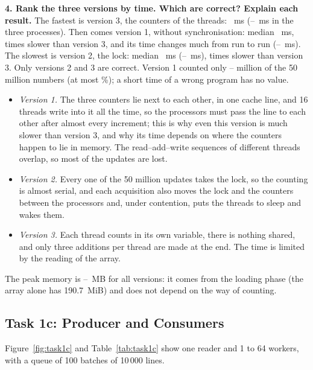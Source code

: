 \documentclass[12pt,a4paper]{article}
\begin{document}
\textbf{4. Rank the three versions by time. Which are correct? Explain each result.} The fastest is version 3, the counters of the threads: \bPerThreadMs{}~ms (\bPerThreadMsMin--\bPerThreadMsMax{}~ms in the three processes). Then comes version 1, without synchronisation: median \bNoSyncMs{}~ms, \bNoSyncRatio{} times slower than version 3, and its time changes much from run to run (\bNoSyncMsMin--\bNoSyncMsMax{}~ms). The slowest is version 2, the lock: median \bLockMs{}~ms (\bLockMsMin--\bLockMsMax{}~ms), \bLockRatio{} times slower than version 3. Only versions 2 and 3 are correct. Version 1 counted only \bNoSyncCountMin--\bNoSyncCountMax{} million of the 50 million numbers (at most \bNoSyncShareMax\%); a short time of a wrong program has no value.

\begin{itemize}
  \item \textit{Version 1.} The three counters lie next to each other, in one cache line, and 16 threads write into it all the time, so the processors must pass the line to each other after almost every increment; this is why even this version is much slower than version 3, and why its time depends on where the counters happen to lie in memory. The read--add--write sequences of different threads overlap, so most of the updates are lost.
  \item \textit{Version 2.} Every one of the 50 million updates takes the lock, so the counting is almost serial, and each acquisition also moves the lock and the counters between the processors and, under contention, puts the threads to sleep and wakes them.
  \item \textit{Version 3.} Each thread counts in its own variable, there is nothing shared, and only three additions per thread are made at the end. The time is limited by the reading of the array.
\end{itemize}

The peak memory is \bMemMin--\bMemMax{}~MB for all versions: it comes from the loading phase (the array alone has 190.7~MiB) and does not depend on the way of counting.

\subsection{Task 1c: Producer and Consumers}

Figure~\ref{fig:task1c} and Table~\ref{tab:task1c} show one reader and 1 to 64 workers, with a queue of 100 batches of 10\,000 lines.
\end{document}
